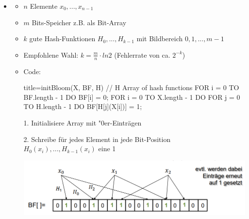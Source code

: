 \documentclass[
    12pt,
    a4paper,
    ngerman,
    color=3b,%
    marginpar=false,
    colorback=false,
    leqno,
]{tudaexercise}
\begin{document}
\begin{itemize}
        \item {}
            \begin{itemize}
                \item $n$ Elemente $x_0,...,x_{n-1}$
                \item $m$ Bits-Speicher z.B. als Bit-Array
                \item $k$ gute Hash-Funktionen $H_0,...,H_{k-1}$ mit Bildbereich $0,1,...,m-1$
                \item Empfohlene Wahl: $k = \frac{m}{n} \cdot ln2$ (Fehlerrate von ca. $2^{-k}$)
                \clearpage
                \item Code:
                \item[]
                    \begin{ccode}[autogobble]{title={initBloom(X, BF, H) // H Array of hash functions}}
                    FOR i = 0 TO BF.length - 1 DO 
                        BF[i] = 0;
                    FOR i = 0 TO X.length - 1 DO
                        FOR j = 0 TO H.length - 1 DO
                            BF[H[j](X[i])] = 1;
                    \end{ccode}
                \item[]
                \item[1.] Initialisiere Array mit "$0$er-Einträgen
                \item[2.] Schreibe für jedes Element in jede Bit-Position $H_0(x_i),...,H_{k-1}(x_i)$ eine 1 
                \item[] \includegraphics[width=15cm]{pictures/bloomCreate.PNG} 
            \end{itemize}


\end{itemize}
\end{document}
